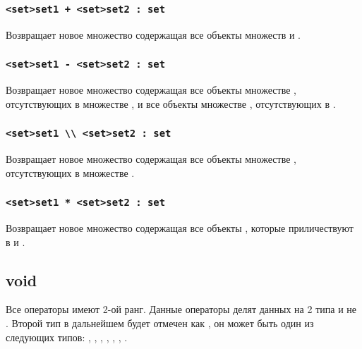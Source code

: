 \documentclass[a4paper, 14pt]{extarticle}
\begin{document}
\subsubsection{\lstinline`<set>set1 + <set>set2 : set`}
	Возвращает новое множество содержащая все объекты множеств  и .

\subsubsection{\lstinline`<set>set1 - <set>set2 : set`}
	Возвращает новое множество содержащая все объекты множестве , отсутствующих в множестве , и все объекты множестве , отсутствующих в .

\subsubsection{\lstinline`<set>set1 \\ <set>set2 : set`}
	Возвращает новое множество содержащая все объекты множестве , отсутствующих в множестве .

\subsubsection{\lstinline`<set>set1 * <set>set2 : set`}
	Возвращает новое множество содержащая все объекты , которые приличествуют в  и .

\subsection{\color{bluemarin}void}
	
	Все  операторы имеют 2-ой ранг. Данные операторы делят данных на 2 типа  и не . Второй тип в дальнейшем будет отмечен как , он может быть один из следующих типов: , , , , , , .
	
\end{document}
